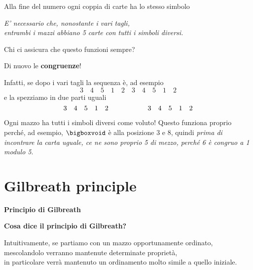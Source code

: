 \documentclass[8pt]{beamer}
\theoremstyle{plain}
\theoremstyle{definition}
\begin{document}
\begin{frame}
\begin{center}
Alla fine del numero ogni coppia di carte ha lo stesso simbolo

\medskip
\smallskip

\emph{E' necessario che, nonostante i vari tagli, \\entrambi i mazzi abbiano 5 carte con tutti i simboli diversi.}
% 
% 
\medskip

Chi ci assicura che questo funzioni sempre?

\medskip

Di nuovo le \textbf{congruenze}!

\bigskip
\bigskip

Infatti, se dopo i vari tagli la sequenza è, ad esempio
$$3\quad 4\quad 5\quad 1\quad 2\quad 3\quad 4\quad 5\quad 1\quad 2$$ e la spezziamo in due parti uguali
$$ 3 \quad 4 \quad 5 \quad 1 \quad 2 \hspace{2 cm} 3\quad 4\quad 5\quad 1\quad 2 $$

Ogni mazzo ha tutti i simboli diversi come voluto! Questo funziona proprio perché, ad esempio, $\bigboxvoid$ è alla posizione 3 e 8, quindi \emph{prima di incontrare la carta uguale, ce ne sono proprio 5 di mezzo, perché 6 è congruo a 1 modulo 5}.
\end{center}
\end{frame}


\section{Gilbreath principle}

\begin{frame}
\begin{center} \textbf{Principio di Gilbreath} \end{center}
\end{frame}

\begin{frame} \begin{center}\textbf{Cosa dice il principio di Gilbreath?}

\medskip
\bigskip

Intuitivamente, se partiamo con un mazzo opportunamente ordinato, \\mescolandolo verranno mantenute determinate proprietà, \\in particolare verrà mantenuto un ordinamento molto simile a quello iniziale.
\end{center}
\end{frame}
\end{document}
